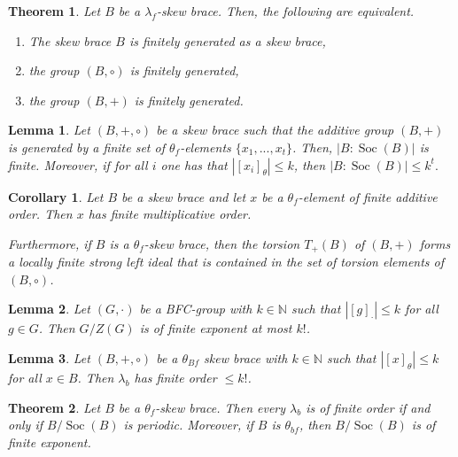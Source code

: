 \documentclass[10pt,a4paper]{amsart}
\newtheorem{lem}{Lemma}
\newtheorem{thm}{Theorem}
\newtheorem{cor}{Corollary}
\newcommand{\N}{\mathbb{N}}
\newcommand{\Soc}{\operatorname{Soc}}
\begin{document}
\begin{thm}\label{fg}
    Let $B$ be a $\lambda_f$-skew brace. Then, the following are equivalent.
    \begin{enumerate}
        \item The skew brace $B$ is finitely generated as a skew brace,
        \item the group $(B,\circ)$ is finitely generated,
        \item the group $(B,+)$ is finitely generated.
    \end{enumerate}
\end{thm}

\begin{lem}
\label{thetafg}
    Let $(B,+,\circ)$ be a skew brace such that the additive group $(B,+)$ is generated by a finite set of $\theta_f$-elements $\{x_1,...,x_t\}$. Then, $|B:\Soc(B)|$ is finite. Moreover, if for all $i$ one has that $|[x_i]_{\theta}| \leq k$, then $|B:\Soc(B)| \leq k^{t}.$
\end{lem}

\begin{cor}
\label{Dietzmann cor}
    Let $B$ be a skew brace and let $x$ be a $\theta_f$-element of finite additive order. Then $x$ has finite multiplicative order.

    Furthermore, if $B$ is a $\theta_f$-skew brace, then the torsion $T_+(B)$ of $(B,+)$ forms a locally finite strong left ideal that is contained in the set of torsion elements of $(B,\circ)$.
\end{cor}

\begin{lem}
\label{BFC -> G/Z has finite exp}
    Let $(G,\cdot)$ be a BFC-group with $k\in\N$ such that
    $|[g]_\cdot|\leq k$ for all $g\in G$.
    Then $G/Z(G)$ is of finite exponent at most $k!$.
\end{lem}

\begin{lem}
\label{order of lambda for theta Bf}
    Let $(B,+,\circ)$ be a $\theta_{Bf}$ skew brace
    with $k\in\N$ such that
    $|[x]_\theta|\leq k$ for all $x\in B$.
    Then $\lambda_b$ has finite order $\leq k!$.
\end{lem}

\begin{thm}\label{unsatisfacttheorem}
    Let $B$ be a $\theta_f$-skew brace.
    Then every $\lambda_b$ is of finite order if and only if $B/\Soc(B)$ is periodic. 
    Moreover, if $B$ is $\theta_{bf}$, then $B/\Soc(B)$ is of finite exponent.
\end{thm}
\end{document}
